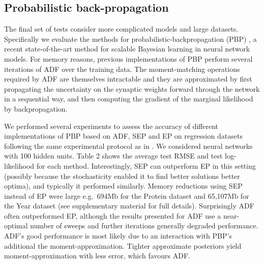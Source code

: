 \subsection{Probabilistic back-propagation}

The final set of tests consider more complicated models and large datasets. Specifically we evaluate the methods for probabilistic-backpropagation (PBP) \cite{miguel:pbp}, a
recent state-of-the-art method for scalable Bayesian learning in neural
network models. For memory reasons, previous implementations of PBP perform several iterations of ADF over the training
data.  The moment-matching operations required by ADF are themselves intractable and they are approximated by
first propagating the uncertainty on the synaptic weights forward through the network in a sequential way, 
and then computing the gradient of the marginal likelihood by backpropagation.

We performed several experiments to assess the accuracy of different implementations of PBP based on ADF, SEP and EP on regression datasets following the same experimental protocol as in \cite{miguel:pbp}.%
We considered neural networks with 100 hidden units.
Table 2 shows the average test RMSE and test log-likelihood for each method. Interestingly, SEP can outperform EP in this setting (possibly because the stochasticity enabled it to find better solutions better optima), and typically it performed similarly. Memory reductions using SEP instead of EP were large e.g.~694Mb for the Protein dataset and 65,107Mb for the Year dataset (see supplementary material for full details). Surprisingly ADF often outperformed EP, although the results presented for ADF use a near-optimal number of sweeps and further iterations generally degraded performance. ADF's good performance is most likely due to an interaction with PBP's additional the moment-approximation. Tighter approximate posteriors yield moment-approximation with less error, which favours ADF.


